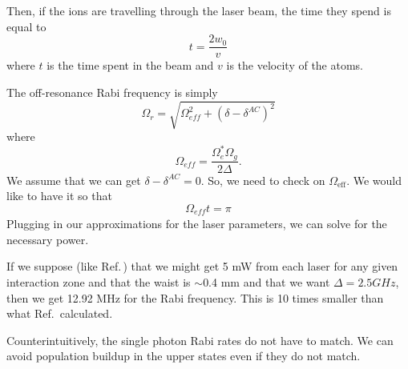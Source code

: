 Then, if the ions are travelling through the laser beam, the time they spend is equal to 
\begin{equation}
t=\frac{2 w_0}{v}
\end{equation}
where $t$ is the time spent in the beam and $v$ is the velocity of the atoms. 

The off-resonance Rabi frequency is simply \cite{Young1997363}
\begin{equation}
\Omega_r=\sqrt{\Omega_{\mathit{eff}}^2+(\delta-\delta^{AC})^2}
\end{equation}
where 
\begin{equation}
\Omega_{\mathit{eff}}=\frac{\Omega_e^*\Omega_g}{2\Delta}.
\end{equation}
We assume that we can get $\delta-\delta^{AC}=0$. So, we need to check on $\Omega_{\mathrm{eff}}$. We would like to have it so that 
\begin{equation}
\Omega_{\mathit{eff}}t=\pi
\end{equation}
Plugging in our approximations for the laser parameters, we can solve for the necessary power. 

If we suppose (like Ref.\,\cite{cjeDiss}) that we might get 5 mW from each laser for any given interaction zone and that the waist is $\sim$0.4 mm and that we want $\Delta= 2.5 GHz$, then we get 12.92 MHz for the Rabi frequency. This is 10 times smaller than what Ref.\,\cite{cjeDiss} calculated. 

Counterintuitively, the single photon Rabi rates do not have to match. We can avoid population buildup in the upper states even if they do not match. 



